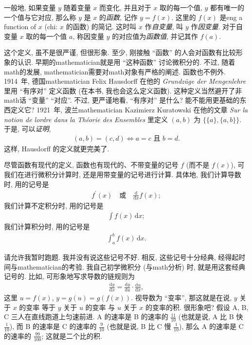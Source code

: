 \begin{definition*}
    一般地,
    如果变量 $y$ 随着变量 $x$ 而变化,
    并且对于 $x$ 取的每一个值,
    $y$ 都有唯一的一个值与它对应,
    那么称 $y$ 是 $x$ 的\emph{函数},
    记作 $y = f(x)$.
    这里的 $f(x)$ 是\gls{eng} a function of $x$
    (\gls{chi}: $x$ 的函数) 的简记.
    这时叫 $x$ 作\emph{自变量},
    叫 $y$ 作\emph{因变量}.
    对于自变量 $x$ 取的每一个值 $a$,
    称因变量 $y$ 的对应值为\emph{函数值},
    并记其作 $f(a)$.
\end{definition*}

这个定义, 虽不是很严谨, 但很形象.
至少, 刚接触 ``函数'' 的人会对函数有比较形象的认识.
早期的\gls{mathematician}就是用 ``这种函数'' 讨论微积分的.
不过, 随着\gls{math}的发展,
\gls{mathematician}需要对\gls{math}对象有严格的阐述.
函数也不例外.
1914~年, 德国\gls{mathematician} Felix Hausdorff 在他的
\textit{Grundz\"uge der Mengenlehre} 里用 ``有序对'' 定义函数
(在本书, 我也会这么定义函数).
这种定义当然避开了非\gls{math}话 ``变量'' ``对应''.
不过, 更严谨地看, ``有序对'' 是什么?
能不能用更基础的东西定义它?
1921~年, 波兰\gls{mathematician} Kazimierz Kuratowski
在他的文章
\textit{%
    Sur la notion de l\textquotesingle{}ordre
    dans la Th\'eorie des Ensembles%
}
里定义 $(a, b)$ 为 $\{ \{a\}, \{a, b\}\}$.
于是, 可以\emph{证明},
\begin{align*}
    (a, b) = (c, d) \iff \text{$a = c$ 且 $b = d$}.
\end{align*}
这样, Hausdorff 的定义就更完美了.


尽管函数有现代的定义,
函数也有现代的、不带变量的记号 $f$ (而不是 $f(x)$),
可我们在进行微积分计算时,
还是用带变量的记号进行计算.
具体地, 我们计算导数时, 用的记号是
\begin{align*}
    f^{\prime} (x) \quad \text{或} \quad \frac{\mathrm{d}}{\mathrm{d}x} {f(x)};
\end{align*}
我们计算不定积分时, 用的记号是
\begin{align*}
    \int {f(x) \,\mathrm{d}x};
\end{align*}
我们计算积分时, 用的记号是
\begin{align*}
    \int_{a}^{b} {f(x) \,\mathrm{d}x}.
\end{align*}

请允许我暂时跑题.
我并没有说这些记号不好.
相反, 这些记号十分经典, 经得起时间与\gls{mathematician}的考验.
我自己初学微积分 (与\gls{math}分析) 时, 就是用这套经典记号的.
比如, 可形象地写求导数的链规则为
\begin{align*}
    \frac{\mathrm{d}y}{\mathrm{d}x}
    = \frac{\mathrm{d}y}{\mathrm{d}u} \cdot \frac{\mathrm{d}u}{\mathrm{d}x},
\end{align*}
这里 $u = f(x)$, $y = g(u) = g(f(x))$.
视导数为 ``变率'', 那这就是在说,
$y$ 关于 $x$ 的变率%
等于 $y$ 关于 $u$ 的变率%
与 $u$ 关于 $x$ 的变率的积.
很形象吧?
假设 A, B, C 三人在直线跑道上匀速前进.
A 的速率是 B 的速率的 $\frac{11}{10}$
(也就是说, A 比 B 快 $\frac{1}{10}$),
而 B 的速率是 C 的速率的 $\frac{9}{10}$
(也就是说, B 比 C 慢 $\frac{1}{10}$),
那么 A 的速率是 C 的速率的 $\frac{99}{100}$;
这就是二个比的积.

